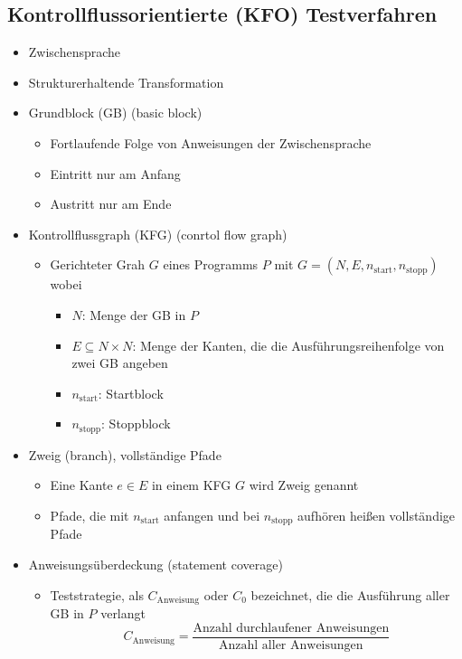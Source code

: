 \documentclass{article}
\begin{document}
\subsection{Kontrollflussorientierte (KFO) Testverfahren}
\begin{itemize}
  \item Zwischensprache
  \item Strukturerhaltende Transformation
  \item Grundblock (GB) (basic block)
  \begin{itemize}
    \item Fortlaufende Folge von Anweisungen der Zwischensprache
    \item Eintritt nur am Anfang
    \item Austritt nur am Ende
  \end{itemize}
  \item Kontrollflussgraph (KFG) (conrtol flow graph)
  \begin{itemize}
    \item Gerichteter Grah $G$ eines Programms $P$ mit $G=(N,E,n_{\text{start}},n_{\text{stopp}})$ wobei
    \begin{itemize}
      \item \textit{$N$}: Menge der GB in $P$
      \item \textit{$E\subseteq N\times N$}: Menge der Kanten, die die Ausführungsreihenfolge von zwei GB angeben
      \item \textit{$n_{\text{start}}$}: Startblock
      \item \textit{$n_{\text{stopp}}$}: Stoppblock
    \end{itemize}
  \end{itemize}
  \item Zweig (branch), vollständige Pfade
  \begin{itemize}
    \item Eine Kante $e\in E$ in einem KFG $G$ wird Zweig genannt
    \item Pfade, die mit $n_{\text{start}}$ anfangen und bei $n_{\text{stopp}}$ aufhören heißen vollständige Pfade
  \end{itemize}
  \item Anweisungsüberdeckung (statement coverage)
  \begin{itemize}
    \item Teststrategie, als $C_{\text{Anweisung}}$ oder $C_0$ bezeichnet, die die Ausführung aller GB in $P$ verlangt
    \[
    C_{\text{Anweisung}}=\frac{\text{Anzahl durchlaufener Anweisungen}}{\text{Anzahl aller Anweisungen}}
\]
\end{itemize}
\end{itemize}
\end{document}
